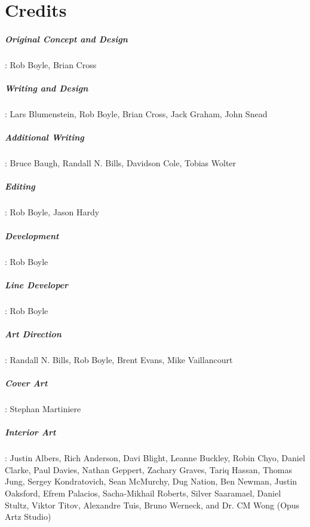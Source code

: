 \chapter{Credits}
\label{chap:credits}

\paragraph{Original Concept and Design}
\label{sec:orig-conc-design}
: Rob Boyle, Brian Cross

\paragraph{Writing and Design}
\label{sec:writing-design}
: Lars Blumenstein, Rob Boyle, Brian Cross, Jack Graham, John Snead

\paragraph{Additional Writing}
\label{sec:additional-writing}
: Bruce Baugh, Randall N. Bills, Davidson Cole, Tobias Wolter

\paragraph{Editing}
\label{sec:editing}
: Rob Boyle, Jason Hardy

\paragraph{Development}
\label{sec:development}
: Rob Boyle

\paragraph{Line Developer}
\label{sec:line-developer}
: Rob Boyle

\paragraph{Art Direction}
\label{sec:art-direction}
: Randall N. Bills, Rob Boyle, Brent Evans, Mike Vaillancourt

\paragraph{Cover Art}
\label{sec:cover-art}
: Stephan Martiniere

\paragraph{Interior Art}
\label{sec:interior-art}
: Justin Albers, Rich Anderson, Davi Blight, Leanne Buckley, Robin
Chyo, Daniel Clarke, Paul Davies, Nathan Geppert, Zachary Graves,
Tariq Hassan, Thomas Jung, Sergey Kondratovich, Sean McMurchy, Dug
Nation, Ben Newman, Justin Oaksford, Efrem Palacios, Sacha-Mikhail
Roberts, Silver Saaramael, Daniel Stultz, Viktor Titov, Alexandre
Tuis, Bruno Werneck, and Dr. CM Wong (Opus Artz Studio)

